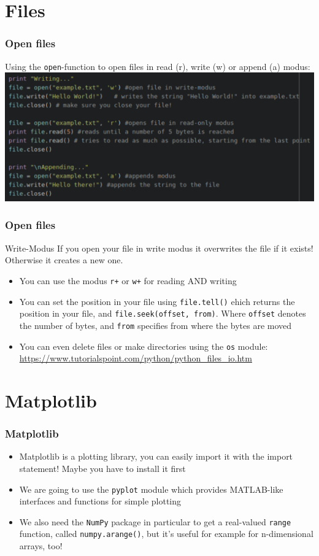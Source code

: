 \documentclass{beamer}
\begin{document}
\section{Files}

\begin{frame}
\frametitle{Open files}
	Using the \texttt{open}-function to open files in read (r), write (w) or append (a) modus:
	\includegraphics[width = 1\textwidth]{openFiles.pdf}
\end{frame}

\begin{frame}
\frametitle{Open files}
	\begin{alertblock}{Write-Modus}
	If you open your file in write modus it overwrites the file if it exists! Otherwise it creates a new one.
	\end{alertblock}
	\begin{itemize}
		\item You can use the modus \texttt{r+} or \texttt{w+} for reading AND writing
		\item You can set the position in your file using \texttt{file.tell()} ehich returns the position in your file, and \texttt{file.seek(offset, from)}. Where \texttt{offset} denotes the number of bytes, and \texttt{from} specifies from where the bytes are moved
		\item You can even delete files or make directories using the \texttt{os} module: \\ \url{https://www.tutorialspoint.com/python/python_files_io.htm}
	\end{itemize}
\end{frame}

\section{Matplotlib}
\begin{frame}
\frametitle{Matplotlib}
	\begin{itemize}
		\item Matplotlib is a plotting library, you can easily import it with the import statement! Maybe you have to install it first 
		\item We are going to use the \texttt{pyplot} module which provides MATLAB-like interfaces and functions for simple plotting
		\item We also need the \texttt{NumPy} package in particular to get a real-valued \texttt{range} function, called \texttt{numpy.arange()}, but it's useful for example for n-dimensional arrays, too!
	\end{itemize}
\end{frame}
\end{document}
